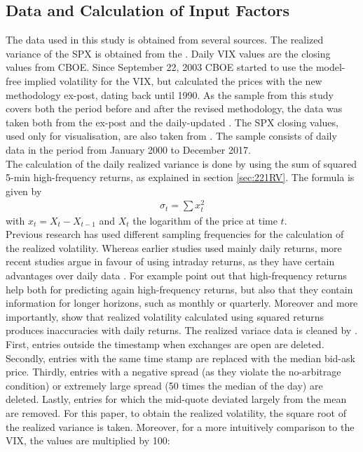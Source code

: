 \subsection{Data and Calculation of Input Factors}\label{sec:41Data}
The data used in this study is obtained from several sources. The realized variance of the \ac{SPX} is obtained from the \textcite{Oxford:RV}. Daily \ac{VIX} values are the closing values from \ac{CBOE}. Since September 22, 2003 \ac{CBOE} started to use the model-free implied volatility for the \ac{VIX}, but calculated the prices with the new methodology ex-post, dating back until 1990. As the sample from this study covers both the period before and after the revised methodology, the data was taken both from the ex-post \textcite{CBOE:old} and the daily-updated \textcite{CBOE:new}. The \ac{SPX} closing values, used only for visualisation, are also taken from \textcite{SandP}. The sample consists of daily data in the period from January 2000 to December 2017. \\
The calculation of the daily realized variance is done by \textcite{Oxford:RV} using the sum of squared 5-min high-frequency returns, as explained in section \ref{sec:221RV}. The formula is given by 
\begin{align}
\sigma_{t} = \sum x_{t}^{2}
\end{align}
with $x_{t} = X_{t} - X_{t-1}$ and $X_{t}$ the logarithm of the price at time $t$. \\%
Previous research has used different sampling frequencies for the calculation of the realized volatility. Whereas earlier studies used mainly daily returns, more recent studies argue in favour of using intraday returns, as they have certain advantages over daily data \parencite{jiang2003}. For example \textcite{andersen2003} point out that high-frequency returns help both for predicting again high-frequency returns, but also that they contain information for longer horizons, such as monthly or quarterly. Moreover and more importantly, \textcite{andersen1998} show that realized volatility calculated using squared returns produces inaccuracies with daily returns. The realized variace data is cleaned by \textcite{Oxford:RV}. First, entries outside the timestamp when exchanges are open are deleted. Secondly, entries with the same time stamp are replaced with the median bid-ask price. Thirdly, entries with a negative spread (as they violate the no-arbitrage condition) or extremely large spread (50 times the median of the day) are deleted. Lastly, entries for which the mid-quote deviated largely from the mean are removed. For this paper, to obtain the realized volatility, the square root of the realized variance is taken. Moreover, for a more intuitively comparison to the \ac{VIX}, the values are multiplied by 100:
